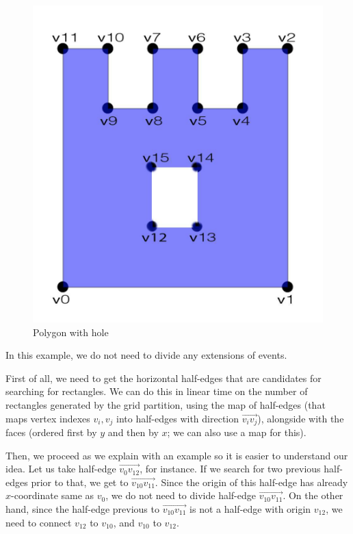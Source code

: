\documentclass[12pt,a4paper,oneside]{article}
\begin{document}
\begin{figure}[h!]
  \centering \includegraphics[scale=0.2]{first.jpg}
  \caption{Polygon with hole}
  \label{fig:grid}
\end{figure}

In this example, we do not need to divide any extensions of events.

First of all, we need to get the horizontal half-edges that are candidates for searching for rectangles. We can do this in linear time on the number of rectangles generated by the grid partition, using the map of half-edges (that maps vertex indexes $v_{i}, v_{j}$ into half-edges with direction $\overrightarrow{v_{i} v_{j}}$), alongside with the faces (ordered first by $y$ and then by $x$; we can also use a map for this).

Then, we proceed as we explain with an example so it is easier to understand our idea. Let us take half-edge $\overrightarrow{v_{0}  v_{12}}$, for instance. If we search for two previous half-edges prior to that, we get to $\overrightarrow{v_{10} v_{11}}$. Since the origin of this half-edge has already $x$-coordinate same as $v_{0}$, we do not need to divide half-edge $\overrightarrow{v_{10} v_{11}}$. On the other hand, since the half-edge previous to $\overrightarrow{v_{10} v_{11}}$ is not a half-edge with origin $v_{12}$, we need to connect $v_{12}$ to $v_{10}$, and $v_{10}$ to $v_{12}$.
\end{document}
